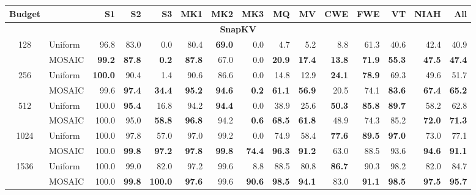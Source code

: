 \begin{table}[tp]
  \centering
  \scriptsize
  \setlength{\tabcolsep}{4pt}
  \renewcommand{\arraystretch}{0.92}
  \begin{tabular}{@{} c l rrrrrrrrrrrrr @{}}
    \toprule
    \textbf{Budget} & & \textbf{S1} & \textbf{S2} & \textbf{S3} & \textbf{MK1} & \textbf{MK2} & \textbf{MK3} & \textbf{MQ} & \textbf{MV} & \textbf{CWE} & \textbf{FWE} & \textbf{VT} & \textbf{NIAH} & \textbf{All} \\
    \midrule
    \multicolumn{15}{c}{\textbf{SnapKV}} \\
    \midrule
    \multirow{2}{*}{128} & Uniform & 96.8 & 83.0 & 0.0 & 80.4 & \textbf{69.0} & 0.0 & 4.7 & 5.2 & 8.8 & 61.3 & 40.6 & 42.4 & 40.9 \\
     & MOSAIC & \textbf{99.2} & \textbf{87.8} & \textbf{0.2} & \textbf{87.8} & 67.0 & 0.0 & \textbf{20.9} & \textbf{17.4} & \textbf{13.8} & \textbf{71.9} & \textbf{55.3} & \textbf{47.5} & \textbf{47.4} \\
    \cmidrule(l){1-15}
    \multirow{2}{*}{256} & Uniform & \textbf{100.0} & 90.4 & 1.4 & 90.6 & 86.6 & 0.0 & 14.8 & 12.9 & \textbf{24.1} & \textbf{78.9} & 69.3 & 49.6 & 51.7 \\
     & MOSAIC & 99.6 & \textbf{97.4} & \textbf{34.4} & \textbf{95.2} & \textbf{94.6} & \textbf{0.2} & \textbf{61.1} & \textbf{56.9} & 20.5 & 74.1 & \textbf{83.6} & \textbf{67.4} & \textbf{65.2} \\
    \cmidrule(l){1-15}
    \multirow{2}{*}{512} & Uniform & 100.0 & \textbf{95.4} & 16.8 & 94.2 & \textbf{94.4} & 0.0 & 38.9 & 25.6 & \textbf{50.3} & \textbf{85.8} & \textbf{89.7} & 58.2 & 62.8 \\
     & MOSAIC & 100.0 & 95.0 & \textbf{58.8} & \textbf{96.8} & 94.2 & \textbf{0.6} & \textbf{68.5} & \textbf{61.8} & 48.9 & 74.3 & 85.2 & \textbf{72.0} & \textbf{71.3} \\
    \cmidrule(l){1-15}
    \multirow{2}{*}{1024} & Uniform & 100.0 & 97.8 & 57.0 & 97.0 & 99.2 & 0.0 & 74.9 & 58.4 & \textbf{77.6} & \textbf{89.5} & \textbf{97.0} & 73.0 & 77.1 \\
     & MOSAIC & 100.0 & \textbf{99.8} & \textbf{97.2} & \textbf{97.8} & \textbf{99.8} & \textbf{74.4} & \textbf{96.3} & \textbf{91.2} & 63.0 & 88.5 & 93.6 & \textbf{94.6} & \textbf{91.1} \\
    \cmidrule(l){1-15}
    \multirow{2}{*}{1536} & Uniform & 100.0 & 99.0 & 82.0 & 97.2 & 99.6 & 8.8 & 88.5 & 80.8 & \textbf{86.7} & 90.3 & 98.2 & 82.0 & 84.7 \\
     & MOSAIC & 100.0 & \textbf{99.8} & \textbf{100.0} & \textbf{97.6} & 99.6 & \textbf{90.6} & \textbf{98.5} & \textbf{94.1} & 83.0 & \textbf{91.1} & \textbf{98.5} & \textbf{97.5} & \textbf{95.7} \\

\end{tabular}
\end{table}
